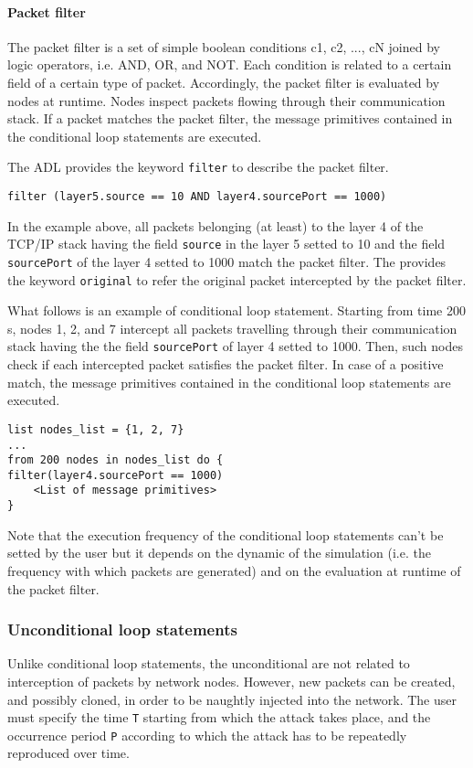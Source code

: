 \paragraph{Packet filter}
The packet filter is a set of simple boolean conditions c1, c2, ..., cN joined by logic operators, i.e. AND, OR, and NOT. 
Each condition is related to a certain field of a certain type of packet. Accordingly, the packet filter is evaluated by nodes at runtime.
Nodes inspect packets flowing through their communication stack. If a packet matches the packet filter, the message primitives contained in the conditional loop statements are executed. 

The ADL provides the keyword \texttt{filter} to describe the packet filter.
%
\begin{lstlisting}[language={adl}]
filter (layer5.source == 10 AND layer4.sourcePort == 1000)
\end{lstlisting}
%
In the example above, all packets belonging (at least) to the layer 4 of the TCP/IP stack having the field \texttt{source} in the layer 5 setted to 10 and the field \texttt{sourcePort} of the layer 4 setted to 1000 match the packet filter.
The \asf provides the keyword \texttt{original} to refer the original packet intercepted by the packet filter.

What follows is an example of conditional loop statement. Starting from time 200 s, nodes 1, 2, and 7 intercept all packets travelling through their communication stack having the the field \texttt{sourcePort} of layer 4 setted to 1000. Then, such nodes check if each intercepted packet satisfies the packet filter. In case of a positive match, the message primitives contained in the conditional loop statements are executed.
%
\begin{lstlisting}[language={adl}]
list nodes_list = {1, 2, 7}
...
from 200 nodes in nodes_list do {
filter(layer4.sourcePort == 1000)
    <List of message primitives>
}
\end{lstlisting}

Note that the execution frequency of the conditional loop statements can't be setted by the user but it depends on the dynamic of the simulation (i.e. the frequency with which packets are generated) and on the evaluation at runtime of the packet filter.

\subsubsection{Unconditional loop statements}
Unlike conditional loop statements, the unconditional are not related to interception of packets by network nodes. However, new packets can be created, and possibly cloned, in order to be naughtly injected into the network. The user must specify the time \texttt{T} starting from which the attack takes place, and the occurrence period \texttt{P} according to which the attack has to be repeatedly reproduced over time. 

